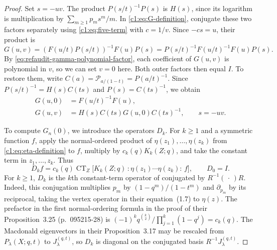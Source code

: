 \documentclass[12pt,reqno,a4paper]{amsart}
\numberwithin{equation}{section}
\numberwithin{figure}{section}
\theoremstyle{plain}
\theoremstyle{definition}
\begin{document}
\begin{proof}
Set $s=-uv$.  The product $P(s/t)^{-1}P(s)$ is $H(s)$, since its
logarithm is multiplication by $\sum_{m\geq1}p_m s^m/m$.
In \eqref{c1:eq:G-definition}, conjugate
these two factors separately using \eqref{c1:eq:five-term} with
$c=1/v$.  Since $-cs=u$, their product is
\[
 G(u,v)=(F(u/t)P(s/t))^{-1}F(u)P(s)
       =P(s/t)^{-1}F(u/t)^{-1}F(u)P(s).
\]
By \eqref{eq:refaudit-gamma-polynomial-factor}, each coefficient of
$G(u,v)$ is polynomial in $v$, so we can set $v=0$ here.  Both outer
factors then equal $I$.  To restore them, write
$C(a)=\mathcal P_{a/(1-t)}=P(a/t)^{-1}$.  Since
$P(s/t)^{-1}=H(s)C(ts)$ and $P(s)=C(ts)^{-1}$, we obtain
\begin{equation}\label{c1:eq:recover-modes}
 \begin{aligned}
 G(u,0)&=F(u/t)^{-1}F(u),\\
 G(u,v)&=H(s)C(ts)G(u,0)C(ts)^{-1},\qquad s=-uv.
 \end{aligned}
\end{equation}

To compute $G_n(0)$, we introduce the operators $D_k$.
For $k\geq1$ and a symmetric function $f$, apply the normal-ordered product
of $\eta(z_1),\ldots,\eta(z_k)$ from \eqref{c1:eq:eta-definition} to $f$,
multiply by $c_k(q)K_k(Z;q)$, and take the constant term in $z_1,\ldots,z_k$.
Thus
\begin{equation}\label{c1:eq:zero-modes}
 D_k f=c_k(q)\operatorname{CT}_Z
 \bigl[K_k(Z;q)\,:\eta(z_1)\cdots\eta(z_k):\,f\bigr],
 \qquad D_0=I.
\end{equation}
For $k\geq1$, $D_k$ is the $k$th constant-term operator of \cite[Definition~3.10, (3.9)]{FHHSY}
conjugated by $R^{-1}(\,\cdot\,)R$.
Indeed, this conjugation multiplies $p_m$ by $(1-q^m)/(1-t^m)$
and $\partial_{p_m}$ by its reciprocal, taking the vertex operator
in their equation~(1.7) to $\eta(z)$.
The prefactor in the first normal-ordering formula in the proof of
their Proposition~3.25 (p.~095215-28) is
$(-1)^k q^{\binom{k}{2}}/\prod_{j=1}^k(1-q^j)=c_k(q)$.
The Macdonald eigenvectors in their Proposition~3.17 may be rescaled from
$P_\lambda(X;q,t)$ to $J_\lambda^{(q,t)}$, so $D_k$ is diagonal
on the conjugated basis $R^{-1}J_\lambda^{(q,t)}$.


\end{proof}
\end{document}
